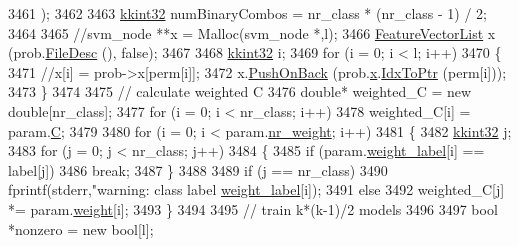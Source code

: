 \begin{DoxyCode}
3461                       );
3462 
3463     \hyperlink{namespace_k_k_b_a8fa4952cc84fda1de4bec1fbdd8d5b1b}{kkint32}  numBinaryCombos = nr\_class * (nr\_class - 1) / 2;
3464 
3465     \textcolor{comment}{//svm\_node **x = Malloc(svm\_node *,l);}
3466     \hyperlink{class_k_k_m_l_l_1_1_feature_vector_list}{FeatureVectorList} x (prob.\hyperlink{struct_s_v_m289___b_f_s_1_1svm__problem_a0b0e37f9bfd7753f691070fdcd05569f}{FileDesc} (), \textcolor{keyword}{false});
3467 
3468     \hyperlink{namespace_k_k_b_a8fa4952cc84fda1de4bec1fbdd8d5b1b}{kkint32} i;
3469     \textcolor{keywordflow}{for}  (i = 0;  i < l;  i++)
3470     \{
3471       \textcolor{comment}{//x[i] = prob->x[perm[i]];}
3472       x.\hyperlink{class_k_k_m_l_l_1_1_feature_vector_list_abd43779a90a6aa3db1de8092be877bdb}{PushOnBack} (prob.\hyperlink{struct_s_v_m289___b_f_s_1_1svm__problem_a41858dbcf26913311ad17674d9eb42a8}{x}.\hyperlink{class_k_k_b_1_1_k_k_queue_acce2bdd8b3327e38266cf198382cd852}{IdxToPtr} (perm[i]));
3473     \}
3474 
3475     \textcolor{comment}{// calculate weighted C}
3476     \textcolor{keywordtype}{double}*  weighted\_C = \textcolor{keyword}{new} \textcolor{keywordtype}{double}[nr\_class];
3477     \textcolor{keywordflow}{for}  (i = 0;  i < nr\_class;  i++)
3478       weighted\_C[i] = param.\hyperlink{struct_s_v_m289___b_f_s_1_1svm__parameter_a6e819bf58fb2b36b28cdf4abf22e3371}{C};
3479 
3480     for  (i = 0;  i < param.\hyperlink{struct_s_v_m289___b_f_s_1_1svm__parameter_aa0f9140ef46b5f6ead1976985039bd3b}{nr\_weight};  i++)
3481     \{  
3482       \hyperlink{namespace_k_k_b_a8fa4952cc84fda1de4bec1fbdd8d5b1b}{kkint32} j;
3483       \textcolor{keywordflow}{for}  (j = 0;  j < nr\_class;  j++)
3484       \{
3485         \textcolor{keywordflow}{if}  (param.\hyperlink{struct_s_v_m289___b_f_s_1_1svm__parameter_aa5fb22fef16001db2528f7ba4554758d}{weight\_label}[i] == label[j])
3486           \textcolor{keywordflow}{break};
3487       \}
3488 
3489       \textcolor{keywordflow}{if}  (j == nr\_class)
3490         fprintf(stderr,\textcolor{stringliteral}{"warning: class label %
      \hyperlink{struct_s_v_m289___b_f_s_1_1svm__parameter_aa5fb22fef16001db2528f7ba4554758d}{weight\_label}[i]);
3491       \textcolor{keywordflow}{else}
3492         weighted\_C[j] *= param.\hyperlink{struct_s_v_m289___b_f_s_1_1svm__parameter_a72708216adcfcbaf21dc5133f7c30e07}{weight}[i];
3493     \}
3494 
3495     \textcolor{comment}{// train k*(k-1)/2 models}
3496     
3497     \textcolor{keywordtype}{bool} *nonzero = \textcolor{keyword}{new} \textcolor{keywordtype}{bool}[l];
}
\end{DoxyCode}
